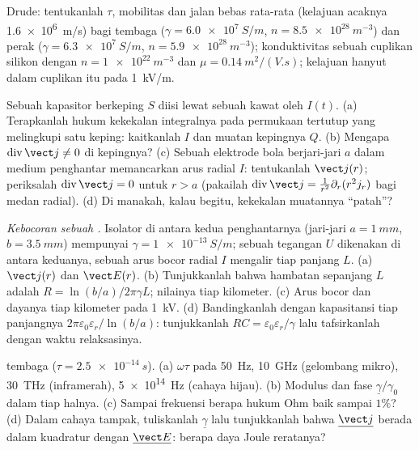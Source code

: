 \begin{exercise}[$\star$]\label{exo:b2:charges-currents-conduction:4}
Drude: tentukanlah $\tau$, mobilitas dan jalan bebas rata-rata (kelajuan acaknya \qty{1.6e6}{m/s})
bagi tembaga ($\gamma = \qty{6.0e7}{S/m}$, $n = \qty{8.5e28}{m^{-3}}$) dan perak
($\gamma = \qty{6.3e7}{S/m}$, $n = \qty{5.9e28}{m^{-3}}$); konduktivitas sebuah
cuplikan silikon dengan $n = \qty{1e22}{m^{-3}}$ dan $\mu = \qty{0.14}{m^2/(V.s)}$;
kelajuan hanyut dalam cuplikan itu pada \qty{1}{kV/m}.
\end{exercise}

\begin{exercise}[$\star\star$]\label{exo:b2:charges-currents-conduction:5}
Sebuah kapasitor berkeping $S$ diisi lewat sebuah kawat oleh $I(t)$. (a) Terapkanlah
hukum kekekalan integralnya pada permukaan tertutup yang melingkupi satu keping:
kaitkanlah $I$ dan muatan kepingnya $Q$. (b) Mengapa $\operatorname{div}\vect j \ne 0$
di kepingnya? (c) Sebuah elektrode bola berjari-jari $a$ dalam medium
penghantar memancarkan arus radial $I$: tentukanlah $\vect j(r)$; periksalah $\operatorname{div}
\vect j = 0$ untuk $r > a$ (pakailah $\operatorname{div}\vect j = \frac1{r^2}\partial_r(r^2j_r)$
bagi medan radial). (d) Di manakah, kalau begitu, kekekalan muatannya
``patah''?
\end{exercise}

\begin{exercise}[$\star\star$]\label{exo:b2:charges-currents-conduction:6}
\emph{Kebocoran sebuah .} Isolator di antara kedua penghantarnya
(jari-jari $a = \qty{1}{mm}$, $b = \qty{3.5}{mm}$) mempunyai $\gamma = \qty{1e-13}{S/m}$; sebuah
tegangan $U$ dikenakan di antara keduanya, sebuah arus bocor radial $I$ mengalir
tiap panjang $L$. (a) $\vect j(r)$ dan $\vect E(r)$. (b) Tunjukkanlah bahwa
hambatan sepanjang $L$ adalah $R = \ln(b/a)/2\pi\gamma L$; nilainya tiap
kilometer. (c) Arus bocor dan dayanya tiap kilometer pada \qty{1}{kV}.
(d) Bandingkanlah dengan kapasitansi tiap panjangnya $2\pi\varepsilon_0\varepsilon_r/\ln(b/a)$:
tunjukkanlah $RC = \varepsilon_0\varepsilon_r/\gamma$ lalu tafsirkanlah dengan waktu relaksasinya.
\end{exercise}

\begin{exercise}[$\star\star$]\label{exo:b2:charges-currents-conduction:7}
 tembaga ($\tau = \qty{2.5e-14}{s}$). (a) $\omega\tau$ pada
\qty{50}{Hz}, \qty{10}{GHz} (gelombang mikro), \qty{30}{THz} (inframerah), \qty{5e14}{Hz}
(cahaya hijau). (b) Modulus dan fase $\underline\gamma/\gamma_0$ dalam tiap halnya.
(c) Sampai frekuensi berapa hukum Ohm baik sampai $1\%$? (d) Dalam cahaya tampak,
tuliskanlah $\underline\gamma$ lalu tunjukkanlah bahwa $\underline{\vect j}$ berada dalam kuadratur dengan
$\underline{\vect E}$: berapa daya Joule reratanya?
\end{exercise}

